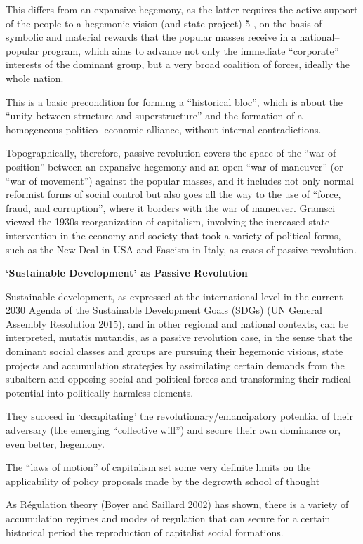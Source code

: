 \documentclass[
]{book}
\begin{document}
This differs from an
expansive hegemony, as the latter requires the active support of the people to a hegemonic vision (and state
project) 5 , on the basis of symbolic and material rewards that the popular masses receive in a national--popular
program, which aims to advance not only the immediate ``corporate'' interests of the dominant group, but a very
broad coalition of forces, ideally the whole nation.

This is a basic precondition for forming a ``historical bloc'',
which is about the ``unity between structure and superstructure'' and the formation of a homogeneous politico-
economic alliance, without internal contradictions.

Topographically, therefore,
passive revolution covers the space of the ``war of position'' between an expansive hegemony and an open ``war
of maneuver'' (or ``war of movement'') against the popular masses, and it includes not only normal reformist
forms of social control but also goes all the way to the use of ``force, fraud, and corruption'', where it borders
with the war of maneuver. Gramsci viewed the 1930s reorganization of capitalism, involving the increased state
intervention in the economy and society that took a variety of political forms, such as the New Deal in USA
and Fascism in Italy, as cases of passive revolution.

\textbf{`Sustainable Development' as Passive Revolution}

Sustainable development, as expressed at the international level in the current 2030 Agenda
of the Sustainable Development Goals (SDGs) (UN General Assembly Resolution 2015), and in other regional
and national contexts, can be interpreted, mutatis mutandis, as a passive revolution case, in the sense that the
dominant social classes and groups are pursuing their hegemonic visions, state projects and accumulation
strategies by assimilating certain demands from the subaltern and opposing social and political forces and
transforming their radical potential into politically harmless elements.

They succeed in `decapitating'
the revolutionary/emancipatory potential of their adversary (the emerging ``collective will'') and secure their
own dominance or, even better, hegemony.

The ``laws of motion'' of capitalism set some very definite limits on the applicability of
policy proposals made by the degrowth school of thought

As Régulation theory (Boyer and Saillard 2002) has shown, there is a variety of accumulation
regimes and modes of regulation that can secure for a certain historical period the reproduction of capitalist social formations.
\end{document}

